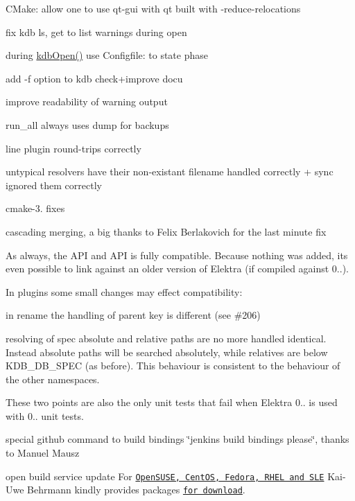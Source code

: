 \begin{DoxyItemize}
\item C\+Make\+: allow one to use qt-\/gui with qt built with -\/reduce-\/relocations
\item fix kdb ls, get to list warnings during open
\item during \hyperlink{group__kdb_ga6808defe5870f328dd17910aacbdc6ca}{kdb\+Open()} use Configfile\+: to state phase
\item add -\/f option to kdb check+improve docu
\item improve readability of warning output
\item run\+\_\+all always uses dump for backups
\item line plugin round-\/trips correctly
\item untypical resolvers have their non-\/existant filename handled correctly + sync ignored them correctly
\item cmake-\/3. fixes
\item cascading merging, a big thanks to Felix Berlakovich for the last minute fix
\end{DoxyItemize}

As always, the A\+PI and A\+PI is fully compatible. Because nothing was added, its even possible to link against an older version of Elektra (if compiled against 0..).

In plugins some small changes may effect compatibility\+:


\begin{DoxyItemize}
\item in rename the handling of parent key is different (see \#206)
\item resolving of spec absolute and relative paths are no more handled identical. Instead absolute paths will be searched absolutely, while relatives are below K\+D\+B\+\_\+\+D\+B\+\_\+\+S\+P\+EC (as before). This behaviour is consistent to the behaviour of the other namespaces.
\end{DoxyItemize}

These two points are also the only unit tests that fail when Elektra 0.. is used with 0.. unit tests.


\begin{DoxyItemize}
\item special github command to build bindings \char`\"{}jenkins build bindings please\char`\"{}, thanks to Manuel Mausz
\item open build service update For \href{https://build.opensuse.org/package/show/home:bekun:devel/elektra}{\tt Open\+S\+U\+SE, Cent\+OS, Fedora, R\+H\+EL and S\+LE} Kai-\/\+Uwe Behrmann kindly provides packages \href{http://software.opensuse.org/download.html?project=home%3Abekun%3Adevel&package=libelektra4}{\tt for download}.
\end{DoxyItemize}

